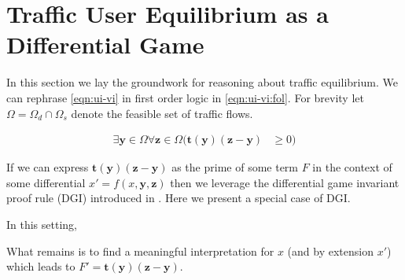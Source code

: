 \section{Traffic User Equilibrium as a Differential Game}

In this section we lay the groundwork for reasoning about traffic equilibrium. 
We can rephrase \eqref{eqn:ui-vi} in first order logic in \eqref{eqn:ui-vi:fol}.
For brevity let $\Omega = \Omega_d \cap \Omega_s$ denote the feasible set of traffic flows.

\begin{align}
    \exists \mathbf{y}\in \Omega \forall \mathbf{z}\in \Omega (\mathbf{t}(\mathbf{y})(\mathbf{z}- \mathbf{y}) &\geq 0) \label{eqn:ui-vi:fol}
\end{align}

If we can express $\mathbf{t}(\mathbf{y})(\mathbf{z}- \mathbf{y})$ as the prime of some term $F$ in the context of some differential $x'=f(x,\mathbf{y},\mathbf{z})$ then we leverage the differential game invariant proof rule (DGI) introduced in \citet{DBLP:journals/tocl/Platzer17}. Here we present a special case of DGI.

\begin{prooftree}
\end{prooftree}

In this setting, 





What remains is to find a meaningful interpretation for $x$ (and by extension $x'$) which leads to $F' = \mathbf{t}(\mathbf{y})(\mathbf{z}- \mathbf{y})$.
